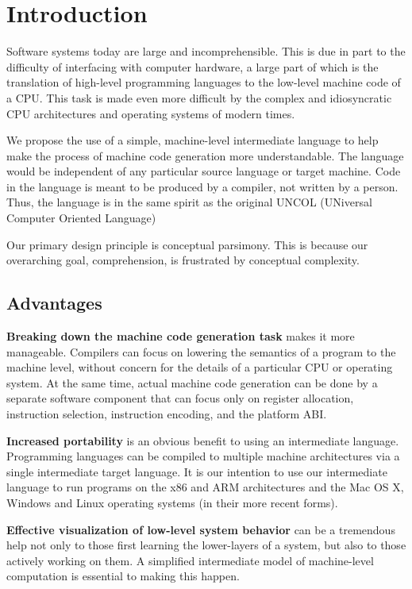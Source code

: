 \section{Introduction}

Software systems today are large and incomprehensible.
This is due in part to the difficulty
of interfacing with computer hardware,
a large part of which is the translation
of high-level programming languages to the
low-level machine code of a CPU. This task is
made even more difficult by the complex and idiosyncratic
CPU architectures and operating systems of modern times.

We propose the use of a simple, machine-level
intermediate language to help make
the process of machine code generation
more understandable.
The language would be independent of any particular
source language or target machine.
Code in the language is meant to be
produced by a compiler, not written by a person.
Thus, the language is in the same
spirit as the original UNCOL (UNiversal
Computer Oriented Language)~\cite{strong1958problem}

Our primary design principle is conceptual parsimony.
This is because our overarching goal, comprehension,
is frustrated by conceptual complexity.

\subsection{Advantages}

\textbf{Breaking down the machine code generation task} makes
it more manageable. Compilers can focus on lowering
the semantics of a program to the machine level,
without concern for the details of a particular CPU or operating system.
At the same time, actual machine code generation can be done
by a separate software component that can focus only on
register allocation, instruction selection, instruction
encoding, and the platform ABI.

\textbf{Increased portability} is an obvious benefit to using an intermediate language.
Programming languages can be compiled to multiple machine architectures
via a single intermediate target language.
It is our intention to use our intermediate language
to run programs on the x86 and ARM architectures and
the Mac OS X, Windows and Linux operating systems (in their more recent forms).

\textbf{Effective visualization of low-level system behavior} can be a tremendous help
not only to those first learning the lower-layers of a system, but
also to those actively working on them.
A simplified intermediate model of machine-level computation is
essential to making this happen.

